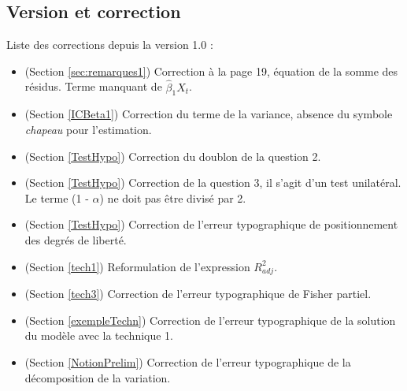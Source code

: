 \subsection*{Version et correction}
Liste des corrections depuis la version 1.0 :
\begin{itemize}
\item (Section \ref{sec:remarques1}) Correction à la page 19, équation de la somme des résidus. Terme manquant de $\hat{\beta}_1 X_t$.
\item (Section \ref{ICBeta1}) Correction du terme de la variance, absence du symbole \emph{chapeau} pour l'estimation. 
\item (Section \ref{TestHypo}) Correction du doublon de la question 2.
\item (Section \ref{TestHypo}) Correction de la question 3, il s'agit d'un test unilatéral. Le terme (1 - $\alpha$) ne doit pas être divisé par 2. 
\item (Section \ref{TestHypo}) Correction de l'erreur typographique de positionnement des degrés de liberté.
\item (Section \ref{tech1}) Reformulation de l'expression $R^2_{adj}$.
\item (Section \ref{tech3}) Correction de l'erreur typographique de Fisher partiel.
\item (Section \ref{exempleTechn}) Correction de l'erreur typographique de la solution du modèle avec la technique 1.
\item (Section \ref{NotionPrelim}) Correction de l'erreur typographique de la décomposition de la variation.
\end{itemize}
